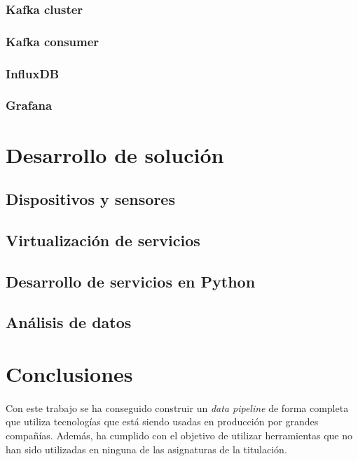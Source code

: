 \documentclass[12pt, a4paper]{article}
\begin{document}
        \subsubsection{Kafka cluster}
        \subsubsection{Kafka consumer}
        \subsubsection{InfluxDB}
        \subsubsection{Grafana}        

        \section{Desarrollo de solución}

        \subsection{Dispositivos y sensores}

        \subsection{Virtualización de servicios}
        
        \subsection{Desarrollo de servicios en Python}
        
        \subsection{Análisis de datos}
        
        \section{Conclusiones}

        \paragraph{}
        Con este trabajo se ha conseguido construir un \textit{data pipeline} de forma completa que utiliza tecnologías que está siendo usadas en producción por grandes compañías. Además, ha cumplido con el objetivo de utilizar herramientas que no han sido utilizadas en ninguna de las asignaturas de la titulación.
\end{document}

